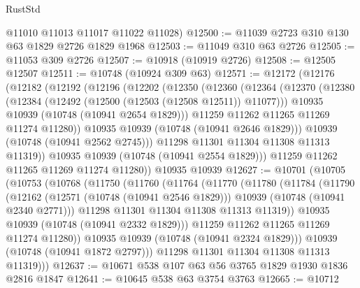 \begin{lexlean}{RustStd}
\begin{coremodule}
      @11010
      @11013
      @11017
      @11022
      @11028)
@12500 := @11039 @2723 @310 @130 @63 @1829 @2726 @1829 @1968
@12503 := @11049 @310 @63 @2726
@12505 := @11053 @309 @2726
@12507 := @10918 (@10919 @2726)
@12508 := @12505 @12507
@12511 := @10748 (@10924 @309 @63)
@12571 := @12172
    (@12176
      (@12182
        (@12192
          (@12196
            (@12202
              (@12350
                (@12360
                  (@12364
                    (@12370
                      (@12380
                        (@12384 (@12492 (@12500 (@12503 (@12508 @12511)) @11077)))
                        @10935
                        @10939
                        (@10748 (@10941 @2654 @1829)))
                      @11259
                      @11262
                      @11265
                      @11269
                      @11274
                      @11280))
                  @10935
                  @10939
                  (@10748 (@10941 @2646 @1829)))
                @10939
                (@10748 (@10941 @2562 @2745)))
              @11298
              @11301
              @11304
              @11308
              @11313
              @11319))
          @10935
          @10939
          (@10748 (@10941 @2554 @1829)))
        @11259
        @11262
        @11265
        @11269
        @11274
        @11280))
    @10935
    @10939
@12627 := @10701
    (@10705
      (@10753
        (@10768
          (@11750
            (@11760
              (@11764
                (@11770
                  (@11780
                    (@11784
                      (@11790
                        (@12162
                          (@12571 (@10748 (@10941 @2546 @1829)))
                          @10939
                          (@10748 (@10941 @2340 @2771)))
                        @11298
                        @11301
                        @11304
                        @11308
                        @11313
                        @11319))
                    @10935
                    @10939
                    (@10748 (@10941 @2332 @1829)))
                  @11259
                  @11262
                  @11265
                  @11269
                  @11274
                  @11280))
              @10935
              @10939
              (@10748 (@10941 @2324 @1829)))
            @10939
            (@10748 (@10941 @1872 @2797)))
          @11298
          @11301
          @11304
          @11308
          @11313
          @11319)))
@12637 := @10671 @538 @107 @63 @56 @3765 @1829 @1930 @1836 @2816 @1847
@12641 := @10645 @538 @63 @3754 @3763
@12665 := @10712

\end{coremodule}
\end{lexlean}
